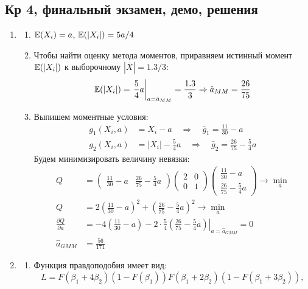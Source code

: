 \documentclass[12pt, a4paper]{article}
\begin{document}
\subsection{Кр 4, финальный экзамен, демо, решения}


\begin{enumerate}
\item
\begin{enumerate}
\item $\mathbb{E}(X_i) = a$, $\mathbb{E}(|X_i|) = 5a/4$
\item Чтобы найти оценку метода моментов, приравняем истинный момент $\mathbb{E}(|X_i|)$
к выборочному $|\bar X| = 1.3/3$:
\[
\mathbb{E}(|X_i|) = \left. \frac{5}{4} a \right|_{a = \hat{a}_{MM}} = \frac{1.3}{3} \Rightarrow \hat{a}_{MM} = \frac{26}{75}
\]
\item Выпишем моментные условия:
\begin{align*}
g_1(X_i, a) &= X_i - a \quad \Rightarrow  \quad \bar{g}_1 = \frac{11}{30} - a \\
g_2(X_i, a) &= |X_i| -\frac{5}{4} a \quad \Rightarrow \quad \bar{g}_2 = \frac{26}{75} - \frac{5}{4}a
\end{align*}
Будем минимизировать величину невязки:
\begin{align*}
Q &= \begin{pmatrix}
\frac{11}{30} - a & \frac{26}{75} - \frac{5}{4}a
\end{pmatrix}
\begin{pmatrix}
2 & 0 \\
0 & 1
\end{pmatrix}
\begin{pmatrix}
\frac{11}{30} - a \\
\frac{26}{75} - \frac{5}{4}a
\end{pmatrix}
\to \min_a \\
Q &= 2\left(\frac{11}{30} - a\right)^2 + \left(\frac{26}{75} - \frac{5}{4}a \right)^2 \to \min_a \\
\frac{\partial Q}{\partial a} &= \left. -4 \left(\frac{11}{30} - a \right) - 2 \cdot \frac{5}{4} \left(\frac{26}{75} - \frac{5}{4}a \right) \right|_{a = \hat{a}_{GMM}} = 0 \\
\hat{a}_{GMM} &= \frac{56}{171}
\end{align*}
\end{enumerate}
\item
\begin{enumerate}
\item Функция правдоподобия имеет вид:
\[
L = F(\beta_1 + 4\beta_2)(1 - F(\beta_1))F(\beta_1 + 2\beta_2)(1 - F(\beta_1 + 3\beta_2)),
\]
\end{enumerate}
\end{enumerate}
\end{document}
